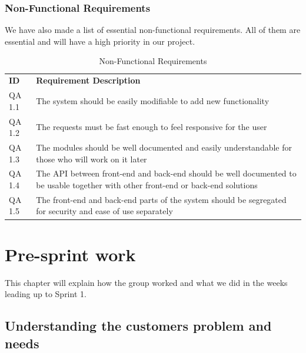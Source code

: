 \documentclass[11pt,a4paper,titlepage,oneside]{report}
\begin{document}
  \subsection{Non-Functional Requirements}
  We have also made a list of essential non-functional requirements. All of them are essential and will have a high priority in our project.

  \begin{longtable}{p{1.4cm} p{9.8cm} }
  \caption[Non-Functional Requirements]{Non-Functional Requirements} \label{nonFuncReqs} \\
  \hline
  \multicolumn{1}{p{1.4cm}}{\textbf{ID}} &
  \multicolumn{1}{p{9.8cm}}{\textbf{Requirement Description}}
  \endfirsthead

  \multicolumn{2}{r}{{Continued on next page}} \\
  \endfoot

  \hline \hline
  \endlastfoot

  \hline
  \gls{QA} 1.1 & The system should be easily modifiable to add new functionality\\ \hline

  \gls{QA} 1.2 & The requests must be fast enough to feel responsive for the user \\ \hline

  \gls{QA} 1.3 & The modules should be well documented and easily understandable for those who will work on it later \\ \hline

  \gls{QA} 1.4 & The \gls{API} between \gls{front-end} and \gls{back-end} should be well documented to be usable together with other \gls{front-end} or \gls{back-end} solutions \\ \hline

  \gls{QA} 1.5 & The \gls{front-end} and \gls{back-end} parts of the system should be segregated for security and ease of use separately \\ \hline

  \end{longtable}


\chapter{Pre-sprint work}
This chapter will explain how the group worked and what we did in the weeks leading up to Sprint 1.

\section{Understanding the customers problem and needs}
\end{document}
